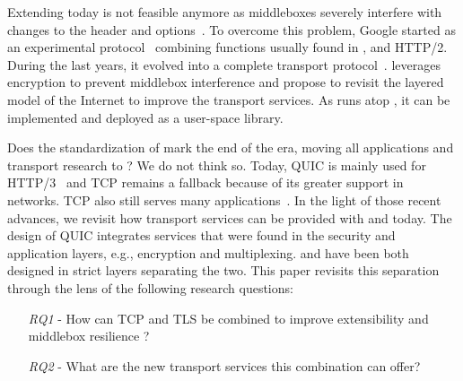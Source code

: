 Extending \tcp today is not feasible anymore as middleboxes severely interfere 
with changes to the \tcp header and 
options~\cite{medina2004measuring,honda2011still, edeline2019bottom}.
To overcome this problem, Google started \quic as an experimental 
protocol~\cite{roskind2013quic,langley2017quic} combining functions usually 
found in \tcp, \tls and HTTP/2. During the last years, it
evolved into a complete transport protocol~\cite{rfc9000}.
\quic leverages encryption to prevent middlebox interference and propose to 
revisit the layered model of the Internet to improve the transport services.
As \quic runs atop \udp, it can be implemented and deployed as a user-space library.

Does the standardization of \quic mark the end of the \tcp era, moving
all applications and transport research to \quic?  We do not think
so. Today, QUIC is mainly used for HTTP/3~\cite{http3} and TCP remains a 
fallback because of its greater support in networks. TCP also still serves many 
applications~\cite{covid19,fiveyears}.
%
In the light of those recent advances, we revisit how transport services can be
provided with \tcp and \tls today. The design of QUIC integrates services
that were found in the security and application layers, e.g., encryption and multiplexing.
\tcp and \tls have been both designed in strict layers separating the two.
This paper revisits this separation through the lens of the following research questions:

\begin{itemize}
	\item[{\small{\textit{RQ1}}} -] How can TCP and TLS be 
	combined to improve extensibility and middlebox resilience ?
	\item[{\small{\textit{RQ2}}} -] What are the new transport services this 
	combination can offer?
\end{itemize}

